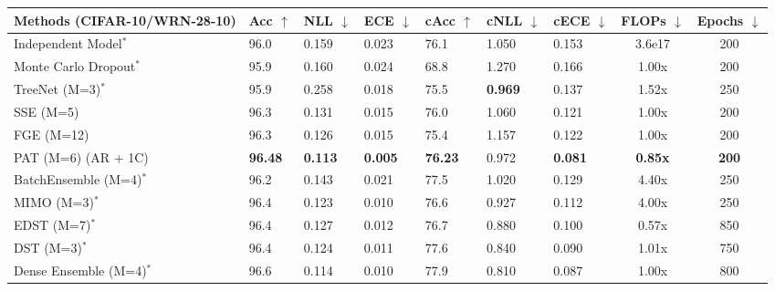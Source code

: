 \documentclass[letterpaper]{article} %
\begin{document}
\begin{table}[t]
\begin{tabularx}{\textwidth}{X l l l l l l c c}
\toprule
Methods (CIFAR-10/WRN-28-10) & Acc $\uparrow$ & NLL $\downarrow$ & ECE $\downarrow$ & cAcc $\uparrow$ & cNLL $\downarrow$ & cECE $\downarrow$ & FLOPs $\downarrow$ & Epochs $\downarrow$ \\
\midrule
Independent Model$^*$ & 96.0 & 0.159 & 0.023 & 76.1 & 1.050 & 0.153 & 3.6e17 & 200 \\
Monte Carlo Dropout$^*$ & 95.9 & 0.160 & 0.024 & 68.8 & 1.270 & 0.166 & 1.00x & 200 \\
TreeNet (M=3)$^*$ & 95.9 & 0.258 & 0.018 & 75.5 & {\bf 0.969} & 0.137 & 1.52x & 250 \\
SSE (M=5) & 96.3 & 0.131 & 0.015 & 76.0 & 1.060 & 0.121 & 1.00x & 200 \\
FGE (M=12) & 96.3 & 0.126 & 0.015 & 75.4 & 1.157 & 0.122 & 1.00x & 200 \\
PAT (M=6) (AR + 1C) & {\bf 96.48} & {\bf 0.113} & {\bf 0.005} & {\bf 76.23} & 0.972 & {\bf 0.081} & {\bf 0.85x} & {\bf 200} \\
\midrule
BatchEnsemble (M=4)$^*$ & 96.2 & 0.143 & 0.021 & 77.5 & 1.020 & 0.129 & 4.40x & 250 \\
MIMO (M=3)$^*$ & 96.4 & 0.123 & 0.010 & 76.6 & 0.927 & 0.112 & 4.00x & 250 \\
EDST (M=7)$^*$ & 96.4 & 0.127 & 0.012 & 76.7 & 0.880 & 0.100 & 0.57x & 850 \\
DST (M=3)$^*$ & 96.4 & 0.124 & 0.011 & 77.6 & 0.840 & 0.090 & 1.01x & 750 \\
Dense Ensemble (M=4)$^*$ & 96.6 & 0.114 & 0.010 & 77.9 & 0.810 & 0.087 & 1.00x & 800 \\
\bottomrule
\end{tabularx}




\end{table}
\end{document}
